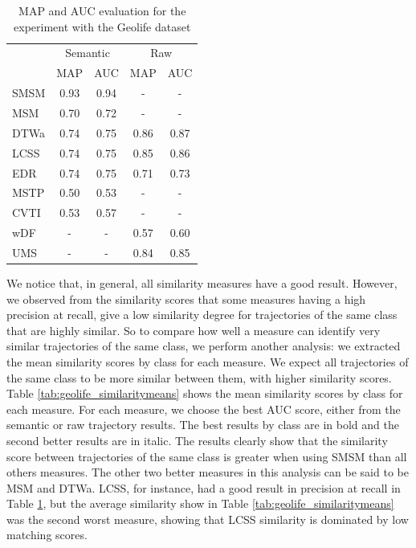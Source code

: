 \documentclass[12pt]{article}
\begin{document}
\begin{table}[ht!]
  \scriptsize
  \centering
  \begin{tabular}{|l|c|c|c|c|}
  	\hline
 & \multicolumn{2}{c}{Semantic}& \multicolumn{2}{|c|}{Raw}\\
 	\cline{2-5}
 & MAP & AUC& MAP & AUC\\
  	\hline
SMSM & 0.93 & 0.94 & - & -\\
 MSM & 0.70 & 0.72 & - & -\\
DTWa & 0.74 & 0.75 & 0.86 & 0.87\\
LCSS & 0.74 & 0.75 & 0.85 & 0.86\\
 EDR & 0.74 & 0.75 & 0.71 & 0.73\\
MSTP & 0.50 & 0.53 & - & -\\
CVTI & 0.53 & 0.57 & - & -\\
 wDF & - & - & 0.57 & 0.60\\
 UMS & - & - & 0.84 & 0.85\\
    \hline
  \end{tabular}
  \caption{MAP and AUC evaluation for the experiment with the Geolife dataset}
  \label{tab:geolife_measures_map_auc}
\end{table}

We notice that, in general, all similarity measures have a good result. However, we observed from the similarity scores that some measures having a high precision at recall, give a low similarity degree for trajectories of the same class that are highly similar. So to compare how well a measure can identify very similar trajectories of the same class, we perform another analysis: we extracted the mean similarity scores by class for each measure. We expect  all trajectories of the same class to be more similar between them, with higher similarity scores.
Table \ref{tab:geolife_similaritymeans} shows the mean similarity scores by class for each measure. For each measure, we choose the best AUC score, either from the semantic or raw trajectory results. The best results by class are in bold and the second better results are in italic. The results clearly show that the similarity score between trajectories of the same class is greater when using SMSM than all others measures. The other two better measures in this analysis can be said to be MSM and DTWa. LCSS, for instance, had a good result in precision at recall in Table \ref{tab:geolife_measures_map_auc}, but the average similarity show in Table \ref{tab:geolife_similaritymeans} was the second worst measure, showing that LCSS similarity is dominated by low matching scores.
\end{document}
